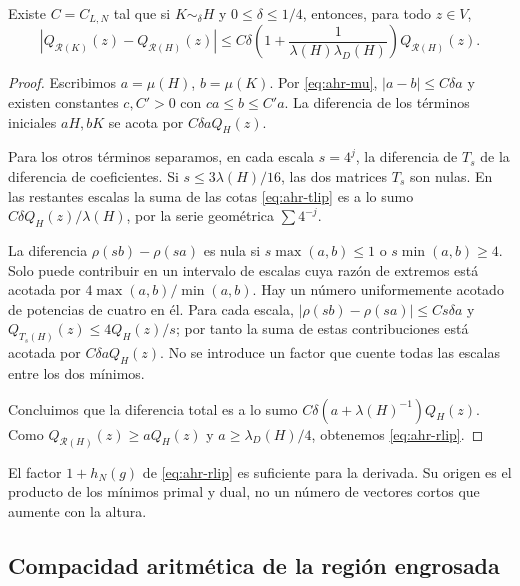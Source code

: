 \begin{proposicion}
\label{prop:ahr-rlip}
Existe $C=C_{L,N}$ tal que si $K\sim_\delta H$ y $0\le\delta\le1/4$, entonces, para todo $z\in V$,
\begin{equation}
 |Q_{\mathcal R(K)}(z)-Q_{\mathcal R(H)}(z)|
 \le C\delta\left(1+\frac1{\lambda(H)\lambda_D(H)}\right)Q_{\mathcal R(H)}(z).
 \label{eq:ahr-rlip}
\end{equation}
\end{proposicion}
\begin{proof}
Escribimos $a=\mu(H)$, $b=\mu(K)$. Por \eqref{eq:ahr-mu}, $|a-b|\le C\delta a$ y existen constantes $c,C'>0$ con $ca\le b\le C'a$. La diferencia de los términos iniciales $aH,bK$ se acota por $C\delta aQ_H(z)$.

Para los otros términos separamos, en cada escala $s=4^j$, la diferencia de $T_s$ de la diferencia de coeficientes. Si $s\le3\lambda(H)/16$, las dos matrices $T_s$ son nulas. En las restantes escalas la suma de las cotas \eqref{eq:ahr-tlip} es a lo sumo $C\delta Q_H(z)/\lambda(H)$, por la serie geométrica $\sum 4^{-j}$.

La diferencia $\rho(sb)-\rho(sa)$ es nula si $s\max(a,b)\le1$ o $s\min(a,b)\ge4$. Solo puede contribuir en un intervalo de escalas cuya razón de extremos está acotada por $4\max(a,b)/\min(a,b)$. Hay un número uniformemente acotado de potencias de cuatro en él. Para cada escala, $|\rho(sb)-\rho(sa)|\le C s\delta a$ y $Q_{T_s(H)}(z)\le4Q_H(z)/s$; por tanto la suma de estas contribuciones está acotada por $C\delta aQ_H(z)$. No se introduce un factor que cuente todas las escalas entre los dos mínimos.

Concluimos que la diferencia total es a lo sumo $C\delta(a+\lambda(H)^{-1})Q_H(z)$. Como $Q_{\mathcal R(H)}(z)\ge aQ_H(z)$ y $a\ge\lambda_D(H)/4$, obtenemos \eqref{eq:ahr-rlip}.
\end{proof}

El factor $1+h_N(g)$ de \eqref{eq:ahr-rlip} es suficiente para la derivada. Su origen es el producto de los mínimos primal y dual, no un número de vectores cortos que aumente con la altura.

\subsection{Compacidad aritmética de la región engrosada}

